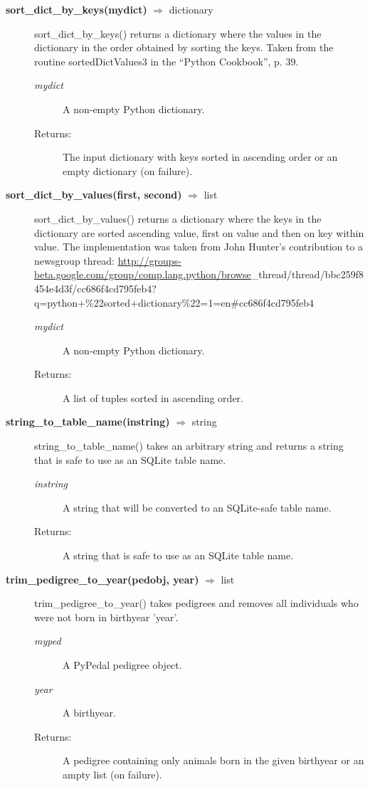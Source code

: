 \begin{description}
\item[\textbf{sort\_dict\_by\_keys(mydict)} $\Rightarrow$ dictionary]
sort\_dict\_by\_keys() returns a dictionary where the values in the dictionary in the order obtained by sorting the keys. Taken from the routine sortedDictValues3 in the ``Python Cookbook'', p. 39.
\begin{description}
\item[\emph{mydict}] A non-empty Python dictionary.
\item[Returns:] The input dictionary with keys sorted in ascending order or an empty dictionary (on failure).
\end{description}

\item[\textbf{sort\_dict\_by\_values(first, second)} $\Rightarrow$ list]
sort\_dict\_by\_values() returns a dictionary where the keys in the dictionary are sorted ascending value, first on value and then on key within value. The implementation was taken from John Hunter's contribution to a newsgroup thread: \url{http://groups-beta.google.com/group/comp.lang.python/browse}\_thread/thread/bbc259f8454e4d3f/cc686f4cd795feb4?q=python+\%22sorted+dictionary\%22=1=en\#cc686f4cd795feb4
\begin{description}
\item[\emph{mydict}] A non-empty Python dictionary.
\item[Returns:] A list of tuples sorted in ascending order.
\end{description}

\item[\textbf{string\_to\_table\_name(instring)} $\Rightarrow$ string]
string\_to\_table\_name() takes an arbitrary string and returns a string that is safe to use as an SQLite table name.
\begin{description}
\item[\emph{instring}] A string that will be converted to an SQLite-safe table name.
\item[Returns:] A string that is safe to use as an SQLite table name.
\end{description}

\item[\textbf{trim\_pedigree\_to\_year(pedobj, year)} $\Rightarrow$ list]
trim\_pedigree\_to\_year() takes pedigrees and removes all individuals who were not born in birthyear 'year'.
\begin{description}
\item[\emph{myped}] A PyPedal pedigree object.
\item[\emph{year}] A birthyear.
\item[Returns:] A pedigree containing only animals born in the given birthyear or an ampty list (on failure).
\end{description}

\end{description}